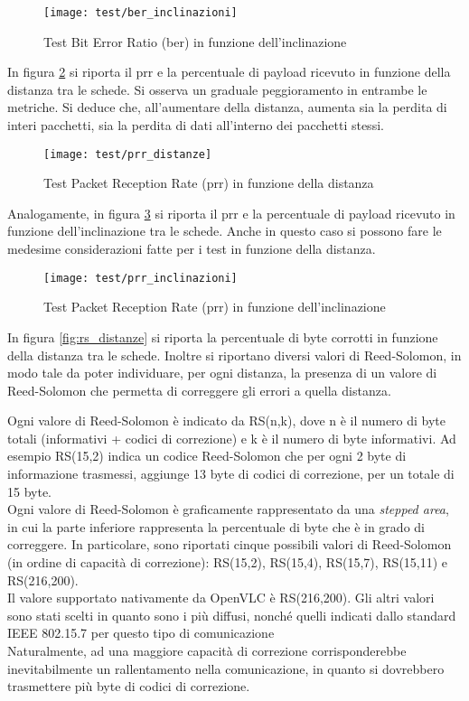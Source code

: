 \begin{figure}[H] 
    \centering 
    \texttt{[image: test/ber\_inclinazioni]} 
    \caption{Test Bit Error Ratio (\gls{ber}) in funzione dell'inclinazione}
    \label{fig:ber_inclinazioni}
\end{figure}

In figura \ref{fig:prr_distanze} si riporta il \gls{prr} e la percentuale di payload ricevuto in funzione della distanza tra le schede. Si osserva un graduale peggioramento in entrambe le metriche. Si deduce che, all'aumentare della distanza, aumenta sia la perdita di interi pacchetti, sia la perdita di dati all'interno dei pacchetti stessi. 

\begin{figure}[H] 
    \centering 
    \texttt{[image: test/prr\_distanze]} 
    \caption{Test Packet Reception Rate (\gls{prr}) in funzione della distanza}
    \label{fig:prr_distanze}
\end{figure}

Analogamente, in figura \ref{fig:prr_inclinazioni} si riporta il \gls{prr} e la percentuale di payload ricevuto in funzione dell'inclinazione tra le schede. Anche in questo caso si possono fare le medesime considerazioni fatte per i test in funzione della distanza.

\begin{figure}[H] 
    \centering 
    \texttt{[image: test/prr\_inclinazioni]} 
    \caption{Test Packet Reception Rate (\gls{prr}) in funzione dell'inclinazione}
    \label{fig:prr_inclinazioni}
\end{figure}

In figura \ref{fig:rs_distanze} si riporta la percentuale di byte corrotti in funzione della distanza tra le schede. Inoltre si riportano diversi valori di Reed-Solomon, in modo tale da poter individuare, per ogni distanza, la presenza di un valore di Reed-Solomon che permetta di correggere gli errori a quella distanza.

Ogni valore di Reed-Solomon è indicato da RS(n,k), dove n è il numero di byte totali (informativi + codici di correzione) e k è il numero di byte informativi. Ad esempio RS(15,2) indica un codice Reed-Solomon che per ogni 2 byte di informazione trasmessi, aggiunge 13 byte di codici di correzione, per un totale di 15 byte.\\
Ogni valore di Reed-Solomon è graficamente rappresentato da una \textit{stepped area}, in cui la parte inferiore rappresenta la percentuale di byte che è in grado di correggere. In particolare, sono riportati cinque possibili valori di Reed-Solomon (in ordine di capacità di correzione): RS(15,2), RS(15,4), RS(15,7), RS(15,11) e RS(216,200).\\
Il valore supportato nativamente da OpenVLC è RS(216,200). Gli altri valori sono stati scelti in quanto sono i più diffusi, nonché quelli indicati dallo standard IEEE 802.15.7 per questo tipo di comunicazione\\
Naturalmente, ad una maggiore capacità di correzione corrisponderebbe inevitabilmente un rallentamento nella comunicazione, in quanto si dovrebbero trasmettere più byte di codici di correzione.

